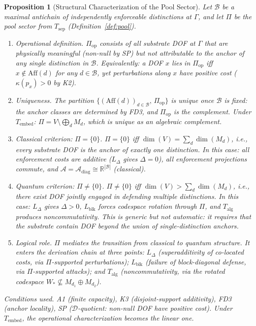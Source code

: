 \documentclass[11pt,a4paper]{article}
\newtheorem{proposition}[theorem]{Proposition}
\theoremstyle{definition}
\begin{document}
\begin{proposition}[Structural Characterization of the Pool Sector]\label{prop:pool}
Let $\mathcal{B}$ be a maximal antichain of independently enforceable distinctions at $\Gamma$, and let $\Pi$ be the pool sector from $T_{\mathrm{sep}}$ (Definition~\ref{def:pool}).
\begin{enumerate}[nosep,label=(\roman*),leftmargin=2em]
\item \textit{Operational definition.}  $\Pi_{\mathrm{op}}$ consists of all substrate DOF at $\Gamma$ that are physically meaningful (non-null by SP) but not attributable to the anchor of any single distinction in $\mathcal{B}$.  Equivalently: a DOF $x$ lies in $\Pi_{\mathrm{op}}$ iff $x \notin \mathrm{Aff}(d)$ for any $d \in \mathcal{B}$, yet perturbations along $x$ have positive cost ($\kappa(p_x) > 0$ by K2).
\item \textit{Uniqueness.}  The partition $\{(\mathrm{Aff}(d))_{d \in \mathcal{B}},\, \Pi_{\mathrm{op}}\}$ is unique once $\mathcal{B}$ is fixed: the anchor classes are determined by FD3, and $\Pi_{\mathrm{op}}$ is the complement.  Under $T_{\mathrm{embed}}$: $\Pi = V \setminus \bigoplus_d M_d$, which is unique as an algebraic complement.
\item \textit{Classical criterion: $\Pi = \{0\}$.}  $\Pi = \{0\}$ iff $\dim(V) = \sum_d \dim(M_d)$, i.e., every substrate DOF is the anchor of exactly one distinction.  In this case: all enforcement costs are additive ($L_\Delta$ gives $\Delta = 0$), all enforcement projections commute, and $\mathcal{A} = \mathcal{A}_{\mathrm{diag}} \cong \mathbb{R}^{|\mathcal{B}|}$ (classical).
\item \textit{Quantum criterion: $\Pi \ne \{0\}$.}  $\Pi \ne \{0\}$ iff $\dim(V) > \sum_d \dim(M_d)$, i.e., there exist DOF jointly engaged in defending multiple distinctions.  In this case: $L_\Delta$ gives $\Delta > 0$, $L_{\mathrm{blk}}$ forces codespace rotation through $\Pi$, and $T_{\mathrm{alg}}$ produces noncommutativity.  This is generic but not automatic: it requires that the substrate contain DOF beyond the union of single-distinction anchors.
\item \textit{Logical role.}  $\Pi$ mediates the transition from classical to quantum structure.  It enters the derivation chain at three points: $L_\Delta$ (superadditivity of co-located costs, via $\Pi$-supported perturbations); $L_{\mathrm{blk}}$ (failure of block-diagonal defense, via $\Pi$-supported attacks); and $T_{\mathrm{alg}}$ (noncommutativity, via the rotated codespace $W_* \not\subseteq M_{d_1} \oplus M_{d_2}$).
\end{enumerate}

\smallskip\noindent\textit{Conditions used.}  A1 (finite capacity), K3 (disjoint-support additivity), FD3 (anchor locality), SP ($\mathcal{D}$-quotient: non-null DOF have positive cost).  Under $T_{\mathrm{embed}}$, the operational characterization becomes the linear one.
\end{proposition}
\end{document}
